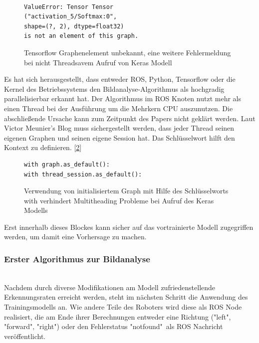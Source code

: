 \documentclass[conference]{IEEEtran}
\begin{document}
	\begin{figure}
		\centering
		\begin{verbatim}

ValueError: Tensor Tensor
("activation_5/Softmax:0",
shape=(?, 2), dtype=float32) 
is not an element of this graph.
\end{verbatim}
		\label{Error3}
		\caption{Tensorflow Graphenelement unbekannt, eine weitere 
		Fehlermeldung bei nicht Threadsavem Aufruf von Keras Modell}
	\end{figure}
	
	Es hat sich herausgestellt, dass entweder ROS, Python, Tensorflow oder die Kernel 
	des Betriebssystems den Bildanalyse-Algorithmus als hochgradig 
	parallelisierbar erkannt hat. Der Algorithmus im ROS Knoten nutzt mehr 
	als einen Thread bei der Ausführung um die Mehrkern CPU auszunutzen. 
	Die abschließende Ursache kann zum Zeitpunkt des Papers nicht geklärt 
	werden.
	Laut Victor Meunier's Blog \cite{Keras} 
	muss sichergestellt werden, dass jeder Thread seinen eigenen Graphen und seinen eigene Session hat. Das Schlüsselwort  hilft den Kontext zu definieren. [\ref{with}]\\
	
	\begin{figure}
		\centering
		\begin{verbatim}
with graph.as_default():
with thread_session.as_default():
		\end{verbatim}
		\label{with}
		\caption{Verwendung von initialisiertem Graph mit Hilfe des 
		Schlüsselworts with verhindert Multitheading Probleme bei Aufruf des 
		Keras Modells}
	\end{figure}
		
	Erst innerhalb dieses Blockes kann sicher auf das vortrainierte Modell zugegriffen werden, um damit eine Vorhersage zu machen.
	\subsubsection{Erster Algorithmus zur Bildanalyse }
	\noindent \\
Nachdem durch diverse Modifikationen am Modell zufriedenstellende 
Erkennungsraten erreicht werden, steht im nächsten Schritt die Anwendung 
des Trainingsmodells an.
Wie andere Teile des Roboters wird diese als ROS Node realisiert, die am Ende ihrer Berechnungen entweder eine Richtung ("left", "forward", "right") oder den Fehlerstatus "notfound"\ als ROS Nachricht veröffentlicht.
\end{document}
